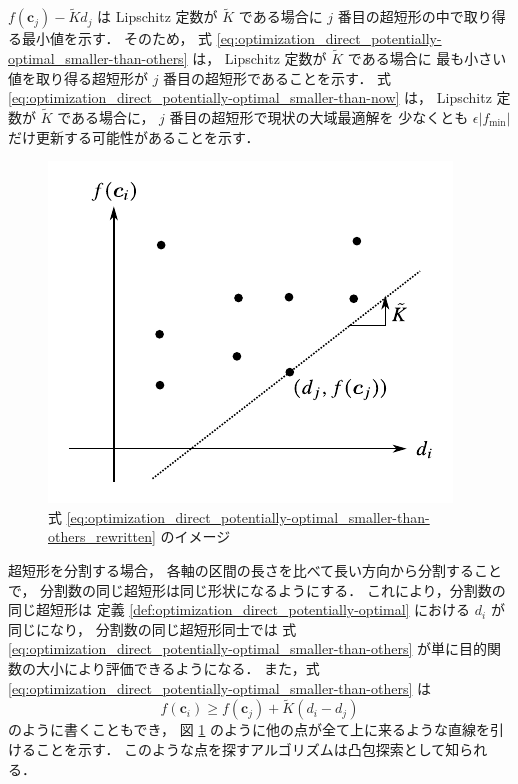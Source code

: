 $f(\bm{c}_j) - \tilde{K} d_j$ は
Lipschitz 定数が $\tilde{K}$ である場合に $j$ 番目の超短形の中で取り得る最小値を示す．
そのため，
式 \eqref{eq:optimization_direct_potentially-optimal_smaller-than-others} は，
Lipschitz 定数が $\tilde{K}$ である場合に
最も小さい値を取り得る超短形が $j$ 番目の超短形であることを示す．
式 \eqref{eq:optimization_direct_potentially-optimal_smaller-than-now} は，
Lipschitz 定数が $\tilde{K}$ である場合に，
$j$ 番目の超短形で現状の大域最適解を
少なくとも $\epsilon |f_{\text{min}}|$ だけ更新する可能性があることを示す．

\begin{figure}[tp]
    \centering
    \includegraphics[width=0.7\linewidth]{optimization/DIRECT-potentially-optimal.pdf}
    \caption{式 \eqref{eq:optimization_direct_potentially-optimal_smaller-than-others_rewritten} のイメージ}
    \label{fig:optimization_direct_potentially-optimal_smaller-than-others-image}
\end{figure}

超短形を分割する場合，
各軸の区間の長さを比べて長い方向から分割することで，
分割数の同じ超短形は同じ形状になるようにする．
これにより，分割数の同じ超短形は
定義 \ref{def:optimization_direct_potentially-optimal} における $d_i$ が同じになり，
分割数の同じ超短形同士では
式 \eqref{eq:optimization_direct_potentially-optimal_smaller-than-others}
が単に目的関数の大小により評価できるようになる．
また，式 \eqref{eq:optimization_direct_potentially-optimal_smaller-than-others} は
\begin{equation}
    f(\bm{c}_i) \ge f(\bm{c}_j) + \tilde{K} (d_i - d_j)
    \label{eq:optimization_direct_potentially-optimal_smaller-than-others_rewritten}
\end{equation}
のように書くこともでき，
図 \ref{fig:optimization_direct_potentially-optimal_smaller-than-others-image}
のように他の点が全て上に来るような直線を引けることを示す．
このような点を探すアルゴリズムは凸包探索として知られる．

